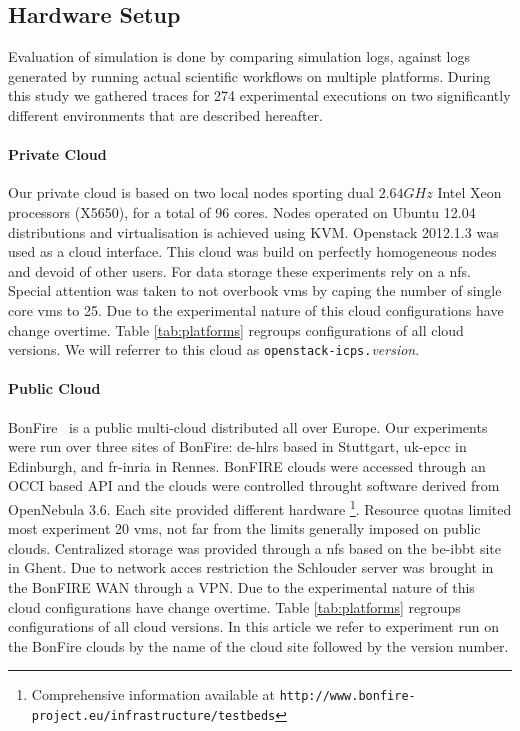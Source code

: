 \subsection{Hardware Setup}

Evaluation  of simulation  is done  by comparing  simulation logs,  against logs
generated by running  actual scientific workflows on  multiple platforms. During
this  study  we   gathered  traces  for  274  experimental   executions  on  two
significantly different environments that are described hereafter.


\paragraph{Private Cloud}

Our private cloud is based on two local nodes sporting dual $2.64GHz$ Intel Xeon
processors (X5650),  for a  total of  96 cores. Nodes  operated on  Ubuntu 12.04
distributions and virtualisation  is achieved using KVM.  Openstack 2012.1.3 was
used as a  cloud interface. This cloud was build  on perfectly homogeneous nodes
and  devoid  of other  users.  For  data storage  these  experiments  rely on  a
\ac{nfs}. Special  attention was taken  to not  overbook \acp{vm} by  caping the
number of  single core \acp{vm}  to 25. Due to  the experimental nature  of this
cloud configurations  have change  overtime. Table  \ref{tab:platforms} regroups
configurations  of  all cloud  versions.  We  will  referrer  to this  cloud  as
\texttt{openstack-icps.}\emph{version}.


\paragraph{Public Cloud}

BonFire~\cite{Kavoussanakis2013} is  a public  multi-cloud distributed  all over
Europe. Our experiments  were run over three sites of  BonFire: de-hlrs based in
Stuttgart, uk-epcc  in Edinburgh,  and fr-inria in  Rennes. BonFIRE  clouds were
accessed  through an  OCCI based  API and  the clouds  were controlled  throught
software derived from OpenNebula 3.6.  Each site provided different hardware%
\footnote{Comprehensive            information           available            at
  \texttt{http://www.bonfire-project.eu/infrastructure/testbeds}}.%
Resource quotas  limited most experiment  20 \acp{vm},  not far from  the limits
generally imposed on  public clouds. Centralized storage was  provided through a
\ac{nfs} based on  the be-ibbt site in Ghent.  Due  to network acces restriction
the Schlouder server was  brought in the BonFIRE WAN through a  VPN.  Due to the
experimental nature  of this  cloud configurations  have change  overtime. Table
\ref{tab:platforms}  regroups  configurations of  all  cloud  versions. In  this
article we  refer to experiment  run on  the BonFire clouds  by the name  of the
cloud site followed by the version number.

